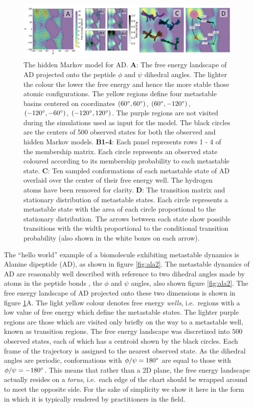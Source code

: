 \documentclass[a4paper,10pt,oneside]{article}
\begin{document}
\begin{sloppy}
\begin{figure}
\includegraphics[width=\textwidth]{./hmm.png}
\caption{The hidden Markov model for AD. \textbf{A}: The free energy landscape of AD projected onto the peptide $\phi$ and $\psi$ dihedral angles.  The lighter the colour the lower the free energy and hence the more stable those atomic configurations. The yellow regions define four metastable basins centered on coordinates $(60\degree,60\degree)$, $(60\degree,-120\degree)$, $(-120\degree,-60\degree)$, $(-120\degree,120\degree)$. The purple regions are not visited during the simulations used as input for the model. The black circles are the centers of 500 observed states for both the observed and hidden Markov models. \textbf{B1-4}: Each panel represents rows 1 - 4 of the membership matrix. Each circle represents an observed state coloured according to its membership probability to each metastable state. \textbf{C}: Ten sampled conformations of each metastable state of AD overlaid over the center of their free energy well. The hydrogen atoms have been removed for clarity. \textbf{D}: The transition matrix and stationary distribution of metastable states.  Each circle represents a metastable state with the area of each circle proportional to the stationary distribution. The arrows between each state show possible transitions with the width proportional to the conditional transition probability (also shown in the white boxes on each arrow). }\label{fig:hmm}
\end{figure}

The ``hello world'' example of a biomolecule exhibiting metastable dynamics is Alanine dipeptide (AD), as shown in figure \ref{fig:ala2}. The metastable dynamics of AD are reasonably well described with reference to two dihedral angles made by atoms in the peptide bonds \cite{Chodera2007}, the $\phi$ and $\psi$ angles, also shown figure \ref{fig:ala2}.  The free energy landscape of AD projected onto these two dimensions is shown in figure \ref{fig:hmm}A. The light yellow colour denotes free energy \emph{wells}, i.e.\ regions with a low value of free energy which define the metastable states.  The lighter purple regions are those which are visited only briefly on the way to a metastable well, known as transition regions. The free energy landscape was discretized into $500$ observed states, each of which has a centroid shown by the black circles. Each frame of the trajectory is assigned to the nearest observed state. As the dihedral angles are periodic, conformations with $\phi/\psi=180\degree$ are equal to those with $\phi/\psi=-180\degree$.  This means that rather than a 2D plane, the free energy landscape actually resides on a \emph{torus}, i.e.\ each edge of the chart should be wrapped around to meet the opposite side. For the sake of simplicity we show it here in the form in which it is typically rendered by practitioners in the field. 


\end{sloppy}
\end{document}
